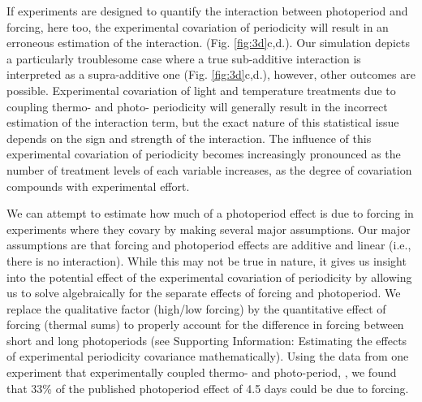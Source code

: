 \documentclass[11pt]{article}
\begin{document}
If experiments are designed to quantify the interaction between photoperiod and forcing, here too, the experimental covariation of periodicity will result in an erroneous estimation of the interaction. (Fig. \ref{fig:3d}c,d.). Our simulation depicts a particularly troublesome case where a true sub-additive interaction is interpreted as a supra-additive one (Fig. \ref{fig:3d}c,d.), however, other outcomes are possible. Experimental covariation of light and temperature treatments due to coupling thermo- and photo- periodicity will generally result in the incorrect estimation of the interaction term, but the exact nature of this statistical issue depends on the sign and strength of the interaction. The influence of this experimental covariation of periodicity becomes increasingly pronounced as the number of treatment levels of each variable increases, as the degree of covariation compounds with experimental effort. 
%

We can attempt to estimate how much of a photoperiod effect is due to forcing in experiments where they covary by making several major assumptions. Our major assumptions are that forcing and photoperiod effects are additive and linear (i.e., there is no interaction). While this may not be true in nature, it gives us insight into the potential effect of the experimental covariation of periodicity by allowing us to solve algebraically for the separate effects of forcing and photoperiod. We replace the qualitative factor (high/low forcing) by the quantitative effect of forcing (thermal sums) to properly account for the difference in forcing between short and long photoperiods (see Supporting Information: Estimating the effects of experimental periodicity covariance mathematically). Using the data from one experiment that experimentally coupled thermo- and photo-period, \citet{Flynn2018}, we found that 33\% of the published photoperiod effect of 4.5 days could be due to forcing. 
\end{document}
